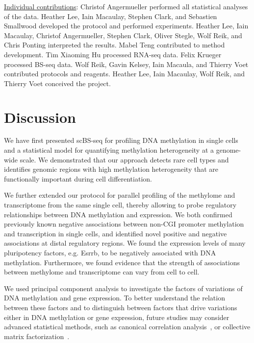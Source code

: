 \begin{center}
\begin{minipage}{.9\linewidth}
\underline{Individual contributions}: Christof Angermueller performed all statistical analyses of the data. Heather Lee, Iain Macaulay, Stephen Clark, and Sebastien Smallwood developed the protocol and performed experiments. Heather Lee, Iain Macaulay, Christof Angermueller, Stephen Clark, Oliver Stegle, Wolf Reik, and Chris Ponting interpreted the results. Mabel Teng contributed to method development. Tim Xiaoming Hu processed RNA-seq data. Felix Krueger processed BS-seq data. Wolf Reik, Gavin Kelsey, Iain Macaula, and Thierry Voet contributed protocols and reagents. Heather Lee, Iain Macaulay, Wolf Reik, and Thierry Voet conceived the project.
\end{minipage}
\end{center}





\section{Discussion}

We have first presented scBS-seq for profiling DNA methylation in single cells and a statistical model for quantifying methylation heterogeneity at a genome-wide scale. We demonstrated that our approach detects rare cell types and identifies genomic regions with high methylation heterogeneity that are functionally important during cell differentiation.

We further extended our protocol for parallel profiling of the methylome and transcriptome from the same single cell, thereby allowing to probe regulatory relationships between DNA methylation and expression. We both confirmed previously known negative associations between non-CGI promoter methylation and transcription in single cells, and identified novel positive and negative associations at distal regulatory regions. We found the expression levels of many pluripotency factors, e.g. Esrrb, to be negatively associated with DNA methylation. Furthermore, we found evidence that the strength of associations between methylome and transcriptome can vary from cell to cell.

We used principal component analysis to investigate the factors of variations of DNA methylation and gene expression. To better understand the relation between these factors and to distinguish between factors that drive variations either in DNA methylation or gene expression, future studies may consider advanced statistical methods, such as canonical correlation analysis~\citep{hardoon_canonical_2004,everitt_canonical_2005}, or collective matrix factorization~\citep{singh_relational_2008,bouchard_convex_2013,cao_multi-view_2015}.

